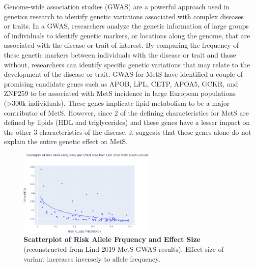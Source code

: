 \documentclass[11pt]{article}
\begin{document}
Genome-wide association studies (GWAS) are a powerful approach used in genetics research to identify genetic variations associated with complex diseases or traits. In a GWAS, researchers analyze the genetic information of large groups of individuals to identify genetic markers, or locations along the genome, that are associated with the disease or trait of interest. By comparing the frequency of these genetic markers between individuals with the disease or trait and those without, researchers can identify specific genetic variations that may relate to the development of the disease or trait. GWAS for MetS have identified a couple of promising candidate genes such as APOB, LPL, CETP, APOA5, GCKR, and ZNF259 to be associated with MetS incidence in large European populations (>300k individuals). These genes implicate lipid metabolism to be a major contributor of MetS. However, since 2 of the defining characteristics for MetS are defined by lipids (HDL and triglycerides) and these genes have a lesser impact on the other 3 characteristics of the disease, it suggests that these genes alone do not explain the entire genetic effect on MetS.

\begin{figure}
  \begin{center}
    \includegraphics[width=0.60\textwidth]{"images/fig1v2.png"}
  \end{center}
  \caption{\textbf{Scatterplot of Risk Allele Frquency and Effect Size} (reconstructed from Lind 2019 MetS GWAS results). Effect size of variant increases inversely to allele frequency.}
  \label{fig:f1}
\end{figure}
\end{document}
